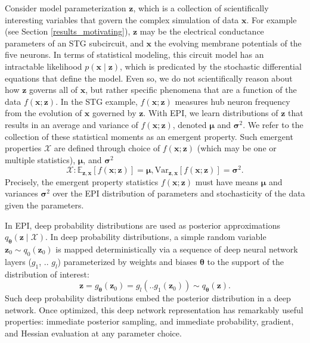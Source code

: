 \documentclass[11pt]{article}
\begin{document}
 
Consider model parameterization $\mathbf{z}$, which is a collection of scientifically interesting variables that govern the complex simulation of data $\mathbf{x}$.
For example (see Section \ref{results_motivating}), $\mathbf{z}$ may be the electrical conductance parameters of an STG subcircuit, and $\mathbf{x}$ the evolving membrane potentials of the five neurons.
In terms of statistical modeling, this circuit model has an intractable likelihood $p(\mathbf{x} \mid \mathbf{z})$, which is predicated by the stochastic differential equations that define the model.
Even so, we do not scientifically reason about how $\mathbf{z}$ governs all of $\mathbf{x}$, but rather specific phenomena that are a function of the data $f(\mathbf{x}; \mathbf{z})$.
In the STG example, $f(\mathbf{x}; \mathbf{z})$ measures hub neuron frequency from the evolution of $\mathbf{x}$ governed by $\mathbf{z}$.
With EPI, we learn distributions of $\mathbf{z}$ that results in an average and variance of $f(\mathbf{x}; \mathbf{z})$, denoted $\bm{\mu}$ and $\bm{\sigma}^2$.
We refer to the collection of these statistical moments as an emergent property.
Such emergent properties $\mathcal{X}$ are defined through choice of $f(\mathbf{x}; \mathbf{z})$ (which may be one or multiple statistics), $\bm{\mu}$, and $\bm{\sigma}^2$
 \begin{equation}
\mathcal{X}: \mathbb{E}_{\mathbf{z},\mathbf{x}}\left[f(\mathbf{x}; \mathbf{z})\right] = \bm{\mu}, \text{Var}_{\mathbf{z},\mathbf{x}}\left[f(\mathbf{x}; \mathbf{z})\right] = \bm{\sigma}^2.
\end{equation}
Precisely, the emergent property statistics $f(\mathbf{x}; \mathbf{z})$ must have means $\bm{\mu}$ and variances $\bm{\sigma}^2$  over the EPI distribution of parameters and stochasticity of the data given the parameters.  

In EPI, deep probability distributions are used as posterior approximations $q_{\bm{\theta}}(\mathbf{z} \mid \mathcal{X})$.
 In deep probability distributions, a simple random variable $\mathbf{z}_0 \sim q_0(\mathbf{z}_0)$ is mapped deterministically via a sequence of deep neural network layers ($g_1$, .. $g_l$) parameterized by weights and biases $\bm{\theta}$ to the support of the distribution of interest:
\begin{equation} \label{eq:deep_transform}
\mathbf{z} = g_{\bm{\theta}}(\mathbf{z}_0) = g_l(..g_1(\mathbf{z}_0)) \sim q_{\bm{\theta}}(\mathbf{z}).
\end{equation}
Such deep probability distributions embed the posterior distribution in a deep network.
Once optimized, this deep network representation has remarkably useful properties: immediate posterior sampling, and immediate probability, gradient, and Hessian evaluation at any parameter choice.
\end{document}
